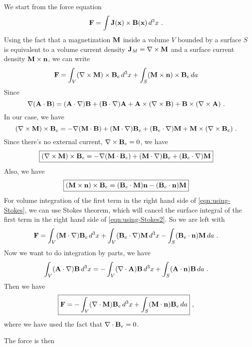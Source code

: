 \documentclass[12pt]{article}
\newcommand{\x}{{\bf x}}
\newcommand{\B}{{\bf B}}
\newcommand{\bJ}{{\bf J}}
\newcommand{\A}{{\bf A}}
\begin{document}
\newpage
{} We start from the force equation
\begin{equation}
    {\bf F} = \int \bJ(\x) \times \B(\x)\, d^3x~.
\end{equation}
Using the fact that a magnetization $\bf M$ inside a volume $V$ bounded by a surface $S$ is equivalent to a volume current density $\bJ_M = \nabla \times {\bf M}$ and a surface current density ${\bf M} \times {\bf n}$, we can write
\begin{align}
    {\bf F} = \int_V (\nabla \times {\bf M})\times \B_e \,d^3 x + \int_S ({\bf M} \times {\bf n}) \times \B_e \,d a
\end{align}
Since
\begin{equation}
    \nabla(\A \cdot \B) = (\A \cdot \nabla) \B + (\B \cdot \nabla) \A + \A \times (\nabla \times \B) + \B \times (\nabla \times \A)~.
\end{equation}
In our case, we have
\begin{equation}
    (\nabla \times {\bf M}) \times \B_e = - \nabla({\bf M} \cdot \B) + ({\bf M} \cdot \nabla) \B_e + (\B_e \cdot \nabla) {\bf M} + {\bf M} \times (\nabla \times \B_e)~.
\end{equation}
Since there's no external current, $\nabla \times \B_e = 0$, we have
\begin{equation}\label{eqn:using-Stokes}
    \boxed{(\nabla \times {\bf M}) \times \B_e = - \nabla({\bf M} \cdot \B_e) + ({\bf M} \cdot \nabla) \B_e + (\B_e \cdot \nabla) {\bf M}}
\end{equation}
Also, we have
\begin{equation}\label{eqn:using-Stokes2}
    \boxed{
    ({\bf M} \times {\bf n}) \times \B_e = (\B_e \cdot {\bf M}) {\bf n} - (\B_e \cdot {\bf n}) {\bf M}}
\end{equation}
For volume integration of the first term in the right hand side of \eqref{eqn:using-Stokes}, we can use Stokes theorem, which will cancel the surface integral of the first term in the right hand side of \eqref{eqn:using-Stokes2}. So we are left with
\begin{equation}
    {\bf F} = \int_V ({\bf M} \cdot \nabla) \B_e\, d^3 x+ \int_V (\B_e \cdot \nabla){\bf M} \, d^3 x - \int_S (\B_e \cdot {\bf n}) {\bf M} \, da~.
\end{equation}
Now we want to do integration by parts, we have
\begin{equation}
    \int_V(\A \cdot \nabla) \B\, d^3x = - \int_V(\nabla \cdot \A) \B\, d^3x + \int_S ( \A\cdot{\bf n} )\B \, da~.
\end{equation}
Then we have
\begin{equation}
    \boxed{
    {\bf F} = - \int_V (\nabla \cdot {\bf M}) \B_e \,d^3x + \int_S({\bf M} \cdot{\bf n} ) \B_e \, da
    }~,
\end{equation}
where we have used the fact that $\nabla \cdot \B_e = 0$.

The force is then

\newpage
{}

\newpage
{}

\newpage
{}
\end{document}
